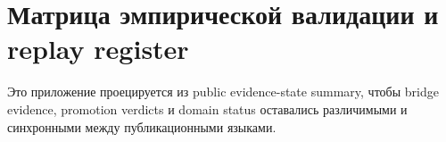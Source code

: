 \section{Матрица эмпирической валидации и replay register}
\label{sec:oc-core-1-3-empirical-validation-matrix-ru}
\label{sec:oc-core-1-3-empirical-validation-matrix}

Это приложение проецируется из public evidence-state summary, чтобы bridge evidence,
promotion verdicts и domain status оставались различимыми и синхронными между
публикационными языками.

\begingroup
\footnotesize
\RaggedRight
\sloppy
\setlength{\tabcolsep}{2pt}
\setlength{\LTleft}{0pt}
\setlength{\LTright}{0pt}

\endgroup
